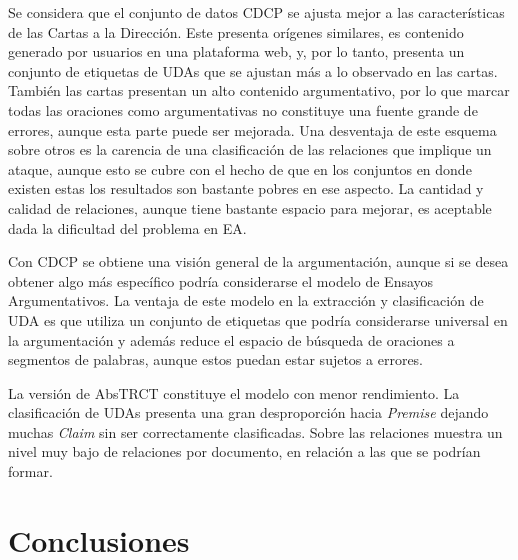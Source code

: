 \documentclass[a4paper,11pt,twocolumn,twoside]{article}
\begin{document}
Se considera que el conjunto de datos CDCP se ajusta mejor a las características de las Cartas 
a la Dirección. Este presenta orígenes similares, es contenido generado por usuarios en una plataforma
web, y, por lo tanto, presenta un conjunto de etiquetas de UDAs que se ajustan más a lo observado 
en las cartas. También las cartas presentan un alto contenido argumentativo, por lo que marcar 
todas las oraciones como argumentativas no constituye una fuente grande de errores, aunque esta 
parte puede ser mejorada. Una desventaja de este esquema sobre otros es la carencia de una 
clasificación de las relaciones que implique un ataque, aunque esto se cubre con el hecho de 
que en los conjuntos en donde existen estas los resultados son bastante pobres en ese aspecto. La cantidad 
y calidad de relaciones, aunque tiene bastante espacio para mejorar, es aceptable dada la dificultad 
del problema en EA.

Con CDCP se obtiene una visión general de la argumentación, aunque si se desea obtener algo 
más específico podría considerarse el modelo de Ensayos Argumentativos. La ventaja de este 
modelo en la extracción y clasificación de UDA es que utiliza un conjunto de etiquetas que 
podría considerarse universal en la argumentación y además reduce el espacio de búsqueda de 
oraciones a segmentos de palabras, aunque estos puedan estar sujetos a errores. 

La versión de AbsTRCT constituye el modelo con menor rendimiento. La clasificación
de UDAs presenta una gran desproporción hacia \textit{Premise} dejando muchas \textit{Claim}
sin ser correctamente clasificadas. Sobre las relaciones muestra un nivel muy bajo de 
relaciones por documento, en relación a las que se podrían formar.

\section{Conclusiones}
\end{document}
